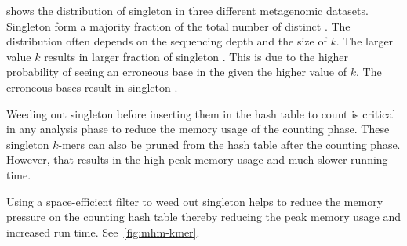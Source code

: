  shows the distribution of singleton \kmers in three
different metagenomic datasets. Singleton \kmers form a majority fraction of
the total number of distinct \kmers. The distribution often depends on the
sequencing depth and the size of $k$. The larger value $k$ results in larger
fraction of singleton \kmers. This is due to the higher probability of seeing
an erroneous base in the \kmer given the higher value of $k$. The erroneous
bases result in singleton \kmers.

Weeding out singleton \kmers before inserting them in the hash table to count
is critical in any \kmer analysis phase to reduce the memory usage of the
counting phase. These singleton $k$-mers can also be pruned from the hash table
after the counting phase. However, that results in the high peak memory usage
and much slower running time.

Using a space-efficient filter to weed out singleton \kmers helps to reduce
the memory pressure on the counting hash table thereby reducing the peak memory
usage and increased run time. See~\cref{fig:mhm-kmer}.


